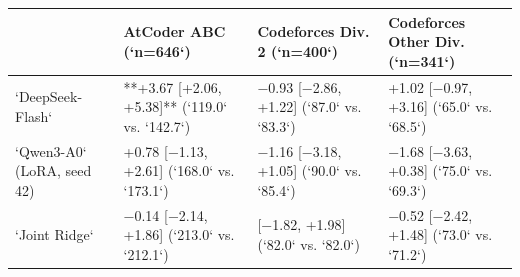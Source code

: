 \begin{tabularx}{\linewidth}{@{}>{\raggedright\arraybackslash}X>{\raggedright\arraybackslash}X>{\raggedright\arraybackslash}X>{\raggedright\arraybackslash}X@{}}
\toprule
{Fixed Automated Ranker} & {AtCoder ABC (`n=646`)} & {Codeforces Div. 2 (`n=400`)} & {Codeforces Other Div. (`n=341`)} \\
\midrule
`DeepSeek-Flash` & **+3.67 [+2.06, +5.38]** (`119.0` vs. `142.7`) & −0.93 [−2.86, +1.22] (`87.0` vs. `83.3`) & +1.02 [−0.97, +3.16] (`65.0` vs. `68.5`) \\
`Qwen3-A0` (LoRA, seed 42) & +0.78 [−1.13, +2.61] (`168.0` vs. `173.1`) & −1.16 [−3.18, +1.05] (`90.0` vs. `85.4`) & −1.68 [−3.63, +0.38] (`75.0` vs. `69.3`) \\
`Joint Ridge` & −0.14 [−2.14, +1.86] (`213.0` vs. `212.1`) & 0.00 [−1.82, +1.98] (`82.0` vs. `82.0`) & −0.52 [−2.42, +1.48] (`73.0` vs. `71.2`) \\
\bottomrule
\end{tabularx}
